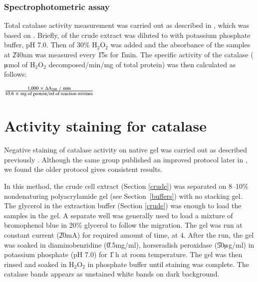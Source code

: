 \subsubsection{Spectrophotometric assay}
\label{chap2:spec_catalase}

Total catalase activity measurement was carried out as described
in \citet{Visick1997}, which was based on \citet{Beers1951}.
Briefly,  of the crude extract was diluted to 
with  potassium phosphate buffer, pH 7.0. Then  of
30\% H$_{2}$O$_{2}$ was added and the absorbance of the samples at
\U{240}{nm} was measured every \U{15}{s} for \U{1}{min}. The
specific activity of the catalase ($\muup$mol of H$_{2}$O$_{2}$
decomposed/min/mg of total protein) was then calculated as
follows:

\begin{center}

$\frac{\textrm{1,000}\ \times\ \Delta
\textrm{A}_{\textrm\scriptsize 240}\ /\
\textrm{min}}{\textrm{43.6}\ \times\ \textrm{mg\ of\ protein} /
\textrm{ml\ of\ reaction\ mixture}}$

\end{center}

\section{Activity staining for catalase}
\label{chap2:activity_staining}

Negative staining of catalase activity on native gel was carried
out as described previously \citep{Gregory1974}. Although the same
group published an improved protocol later in \citet{Clare1984},
we found the older protocol gives consistent results.

In this method, the crude cell extract (Section \ref{crude}) was
separated on 8--10\% nondenaturing polyacrylamide gel (see
Section~\ref{buffers}) with no stacking gel. The glycerol in the
extraction buffer (Section \ref{crude}) was enough to load the
samples in the gel. A separate well was generally used to load a
mixture of bromophenol blue in 20\% glycerol to follow the
migration. The gel was run at constant current (\U{20}{mA}) for
required amount of time, at 4\dg{}\@. After the run, the gel was
soaked in diaminobenzidine (\U{0.5}{mg/ml}), horseradish
peroxidase (\U{50}{$\muup$g/ml}) in  potassium phosphate
(pH 7.0) for \U{1} h at room temperature. The gel was then rinsed
and soaked in \mM{20} H$_{2}$O$_{2}$ in phosphate buffer until
staining was complete. The catalase bands appears as unstained
white bands on dark background.

